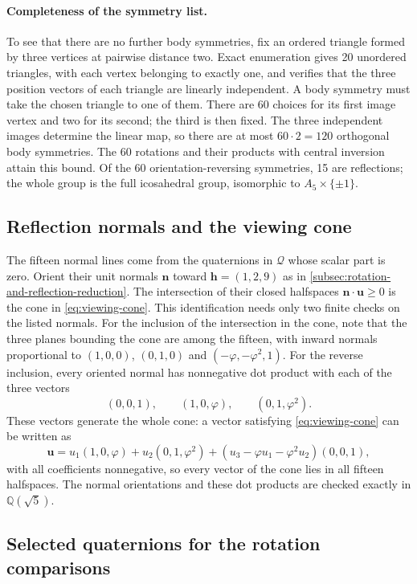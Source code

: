 \paragraph{Completeness of the symmetry list.}
To see that there are no further body symmetries, fix an ordered triangle
formed by three vertices at pairwise distance two. Exact enumeration gives
20 unordered triangles, with each vertex belonging to exactly one, and verifies
that the three position vectors of each triangle are linearly independent.
A body symmetry must take the chosen triangle to one of them. There are
60 choices for its first image vertex and two for its second; the third is
then fixed. The three independent images determine the linear map, so
there are at most $60\cdot2=120$ orthogonal body symmetries. The 60
rotations and their products with central inversion attain this bound.
Of the 60 orientation-reversing symmetries, 15 are reflections; the whole
group is the full icosahedral group, isomorphic to $A_5\times\{\pm1\}$.

\subsection{Reflection normals and the viewing cone}\label{app:reflection-normals-and-the-viewing-cone}

The fifteen normal lines come from the quaternions in $\mathcal Q$ whose
scalar part is zero. Orient their unit normals $\mathbf n$ toward
$\mathbf h=(1,2,9)$ as in \cref{subsec:rotation-and-reflection-reduction}.
The intersection of their closed halfspaces $\mathbf n\cdot\mathbf u\ge0$ is the cone in
\cref{eq:viewing-cone}. This identification needs only two finite checks
on the listed normals.
For the inclusion of the intersection in the cone, note that the three
planes bounding the cone are among the fifteen, with inward normals
proportional to $(1,0,0)$, $(0,1,0)$ and $(-\varphi,-\varphi^2,1)$.
For the reverse inclusion, every oriented normal has nonnegative dot product with each of
the three vectors
\[
  (0,0,1),\qquad(1,0,\varphi),\qquad(0,1,\varphi^2).
\]
These vectors generate the whole cone: a vector satisfying
\cref{eq:viewing-cone} can be written as
\[
  \mathbf u=u_1(1,0,\varphi)+u_2(0,1,\varphi^2)
    +(u_3-\varphi u_1-\varphi^2u_2)(0,0,1),
\]
with all coefficients nonnegative, so every vector of the cone lies in all
fifteen halfspaces.
The normal orientations and these dot products are checked exactly in
$\mathbb Q(\sqrt5)$.

\subsection{Selected quaternions for the rotation comparisons}\label{app:selected-quaternions-for-the-rotation-comparisons}

